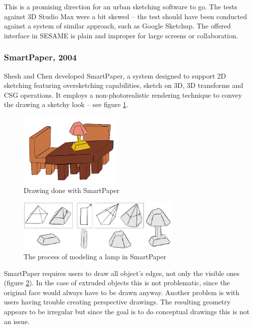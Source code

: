 This is a promising direction for an urban sketching software to go.
The tests against 3D Studio Max were a bit skewed -- the test should
have been conducted against a system of similar approach, such as Google Sketchup.
The offered interface in SESAME is plain and improper for large screens or collaboration.


\subsubsection{SmartPaper, 2004}

Shesh and Chen \cite{SMARTPAPER} developed SmartPaper, a system designed to support
2D sketching featuring oversketching capabilities, sketch on 3D, 3D transforms and
CSG operations. It employs a non-photorealistic rendering technique to convey the
drawing a sketchy look -- see figure \ref{FIG-SMARTPAPER}.

\begin{figure}[!ht]
	\centering
	\includegraphics[width=5cm]{gfx/smartpaper.png}
	\caption{Drawing done with SmartPaper}
	\label{FIG-SMARTPAPER}
\end{figure}

\begin{figure}[!ht]
	\centering
	\includegraphics[width=8cm]{gfx/smartpaper2.png}
	\caption{The process of modeling a lamp in SmartPaper}
	\label{FIG-SMARTPAPER2}
\end{figure}


SmartPaper requires users to draw all object's edges, not only the visible ones (figure \ref{FIG-SMARTPAPER2}).
In the case of extruded objects this is not problematic, since the original face would always have to be drawn anyway.
Another problem is with users having trouble creating perspective drawings.
The resulting geometry appears to be irregular but since the goal is to do
conceptual drawings this is not an issue.

